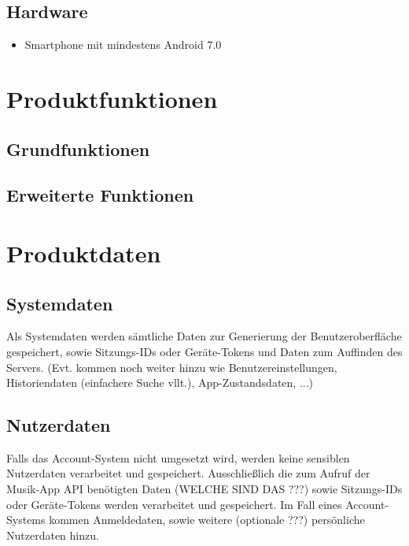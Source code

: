 \documentclass[oneside, ngerman]{sdqtechreport}
\begin{document}
\section{Hardware}
\label{sec:Produktumgebung:Hardware}

\begin{itemize}
    \item Smartphone mit mindestens Android 7.0
\end{itemize}



\chapter{Produktfunktionen}
\label{chap:Produktfunktionen}

\section{Grundfunktionen}
\label{sec:Produktfunktionen:Software}

\section{Erweiterte Funktionen}
\label{sec:Produktfunktionen:Hardware}



\chapter{Produktdaten}
\label{chap:Produktdaten}

\section{Systemdaten}
\label{sec:Produktdaten:Systemdaten}

Als Systemdaten werden sämtliche Daten zur Generierung der Benutzeroberfläche gespeichert, sowie Sitzungs-IDs oder Geräte-Tokens und Daten zum Auffinden des Servers. (Evt. kommen noch weiter hinzu wie Benutzereinstellungen, Historiendaten (einfachere Suche vllt.),  App-Zustandsdaten, ...)

\section{Nutzerdaten}
\label{sec:Produktdaten:Nutzerdaten}

Falls das Account-System nicht umgesetzt wird, werden keine sensiblen Nutzerdaten verarbeitet und gespeichert. Ausschließlich die zum Aufruf der Musik-App API benötigten Daten (WELCHE SIND DAS ???) sowie Sitzungs-IDs oder Geräte-Tokens werden verarbeitet und gespeichert.
Im Fall eines Account-Systems kommen Anmeldedaten, sowie weitere (optionale ???) persönliche Nutzerdaten hinzu.
\end{document}
